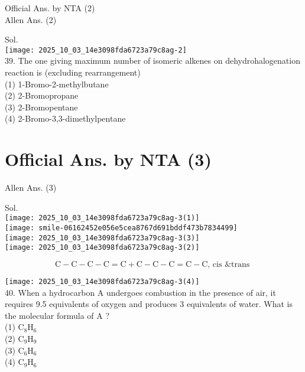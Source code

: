 \documentclass[10pt]{article}
\begin{document}
Official Ans. by NTA (2)\\
Allen Ans. (2)

Sol.\\
\texttt{[image: 2025\_10\_03\_14e3098fda6723a79c8ag-2]}\\
39. The one giving maximum number of isomeric alkenes on dehydrohalogenation reaction is (excluding rearrangement)\\
(1) 1-Bromo-2-methylbutane\\
(2) 2-Bromopropane\\
(3) 2-Bromopentane\\
(4) 2-Bromo-3,3-dimethylpentane

\section*{Official Ans. by NTA (3)}
Allen Ans. (3)

Sol.\\
\texttt{[image: 2025\_10\_03\_14e3098fda6723a79c8ag-3(1)]}\\
\texttt{[image: smile-06162452e056e5cea8767d691bddf473b7834499]}\\
\texttt{[image: 2025\_10\_03\_14e3098fda6723a79c8ag-3(3)]}\\
\texttt{[image: 2025\_10\_03\_14e3098fda6723a79c8ag-3(2)]}

\[
\mathrm{C}-\mathrm{C}-\mathrm{C}-\mathrm{C}=\mathrm{C}+\mathrm{C}-\mathrm{C}-\mathrm{C}=\mathrm{C}-\mathrm{C} \text {, cis \& trans }
\]

\texttt{[image: 2025\_10\_03\_14e3098fda6723a79c8ag-3(4)]}\\
40. When a hydrocarbon A undergoes combustion in the presence of air, it requires 9.5 equivalents of oxygen and produces 3 equivalents of water. What is the molecular formula of A ?\\
(1) \(\mathrm{C}_{8} \mathrm{H}_{6}\)\\
(2) \(\mathrm{C}_{9} \mathrm{H}_{9}\)\\
(3) \(\mathrm{C}_{6} \mathrm{H}_{6}\)\\
(4) \(\mathrm{C}_{9} \mathrm{H}_{6}\)
\end{document}

